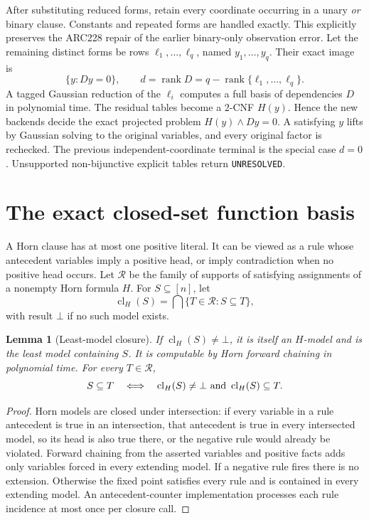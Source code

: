 \documentclass[11pt]{article}
\newtheorem{lemma}[theorem]{Lemma}
\newcommand{\cl}{\operatorname{cl}}
\begin{document}
After substituting reduced forms, retain every coordinate occurring in
a unary \emph{or} binary clause. Constants and repeated forms are handled
exactly. This explicitly preserves the ARC228 repair of the earlier
binary-only observation error. Let the remaining distinct forms be rows
\(\ell_1,\ldots,\ell_q\), named \(y_1,\ldots,y_q\).
Their exact image is
\[
 \{y:D y=0\},
 \qquad
 d=\operatorname{rank}D
   =q-\operatorname{rank}\{\ell_1,\ldots,\ell_q\}.
\]
A tagged Gaussian reduction of the \(\ell_i\) computes a full basis of
dependencies \(D\) in polynomial time. The residual tables become a
2-CNF \(H(y)\). Hence the new backends decide the exact projected problem
\(H(y)\land Dy=0\). A satisfying \(y\) lifts by Gaussian solving to the
original variables, and every original factor is rechecked.
The previous independent-coordinate terminal is the special case \(d=0\).
Unsupported non-bijunctive explicit tables return \texttt{UNRESOLVED}.

\section{The exact closed-set function basis}
A Horn clause has at most one positive literal. It can be viewed as a
rule whose antecedent variables imply a positive head, or imply
contradiction when no positive head occurs.
Let \(\mathcal R\) be the family of supports of satisfying assignments
of a nonempty Horn formula \(H\).
For \(S\subseteq[n]\), let
\[
 \cl_H(S)=
 \bigcap\{T\in\mathcal R:S\subseteq T\},
\]
with result \(\bot\) if no such model exists.

\begin{lemma}[Least-model closure]
If \(\cl_H(S)\ne\bot\), it is itself an \(H\)-model and is the least model
containing \(S\). It is computable by Horn forward chaining in polynomial
time. For every \(T\in\mathcal R\),
\[
 S\subseteq T
 \quad\Longleftrightarrow\quad
 \cl_H(S)\ne\bot\ \hbox{and}\ \cl_H(S)\subseteq T.
\]
\end{lemma}
\begin{proof}
Horn models are closed under intersection: if every variable in a rule
antecedent is true in an intersection, that antecedent is true in every
intersected model, so its head is also true there, or the negative rule
would already be violated. Forward chaining from the asserted variables
and positive facts adds only variables forced in every extending model.
If a negative rule fires there is no extension. Otherwise the fixed
point satisfies every rule and is contained in every extending model.
An antecedent-counter implementation processes each rule incidence at
most once per closure call.
\end{proof}
\end{document}
